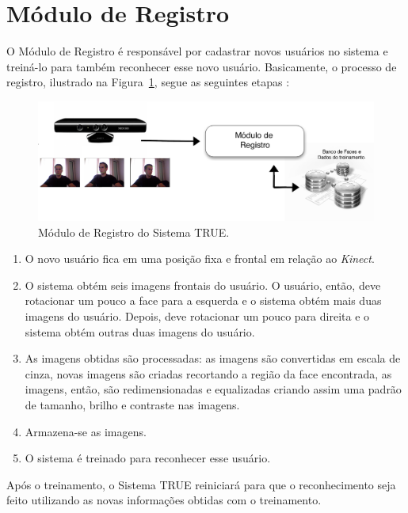 \section{Módulo de Registro}

	O Módulo de Registro é responsável por cadastrar novos usuários no sistema e treiná-lo para também reconhecer esse novo usuário. Basicamente, o processo de registro, ilustrado na Figura~\ref{fig:registro}, segue as seguintes etapas :

		\begin{figure}[htb]
			\begin{center}
				\includegraphics[scale=1.5]{figuras/4.ProblemaEProposta/registro.png}
			\end{center}
			\caption{Módulo de Registro do Sistema TRUE.}
			\label{fig:registro}
		\end{figure}		

		\begin{enumerate}
			\item O novo usuário fica em uma posição fixa e frontal em relação ao \textit{Kinect}. 
			\item O sistema obtém seis imagens frontais do usuário. O usuário, então, deve rotacionar um pouco a face para a esquerda e o sistema obtém mais duas imagens do usuário. Depois, deve rotacionar um pouco para direita e o sistema obtém outras duas imagens do usuário.
			\item As imagens obtidas são processadas: as imagens são convertidas em escala de cinza, novas imagens são criadas recortando a região da face encontrada, as imagens, então, são redimensionadas e equalizadas criando assim uma padrão de tamanho, brilho e contraste nas imagens.
			\item Armazena-se as imagens.
			\item O sistema é treinado para reconhecer esse usuário.
		\end{enumerate}

	Após o treinamento, o Sistema TRUE reiniciará para que o reconhecimento seja feito utilizando as novas informações obtidas com o treinamento.

